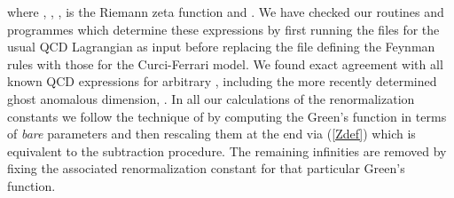 \documentclass[a4paper,11pt]{article}
\begin{document}
where \coordHE{}  \myHighlight{$=$}\coordHE{}  \coordHE{}, \coordHE{}  \myHighlight{$=$}\coordHE{}  \coordHE{}, \coordHE{}  \myHighlight{$=$}\coordHE{}  \coordHE{}, \coordHE{} is the
Riemann zeta function and \coordHE{}  \myHighlight{$=$}\coordHE{}  \coordHE{}. We have checked our routines
and programmes which determine these expressions by first running the files for
the usual QCD Lagrangian as input before replacing the file defining the 
Feynman rules with those for the Curci-Ferrari model. We found exact agreement 
with all known QCD expressions for arbitrary \myHighlight{$\alpha$}\coordHE{}, including the more 
recently determined ghost anomalous dimension, \cite{36,37,38,39,40}. In all 
our calculations of the renormalization constants we follow the technique of 
\cite{39} by computing the Green's function in terms of {\em bare} parameters 
and then rescaling them at the end via (\ref{Zdef}) which is equivalent to the
subtraction procedure. The remaining infinities are removed by fixing the 
associated renormalization constant for that particular Green's function.  
\end{document}
